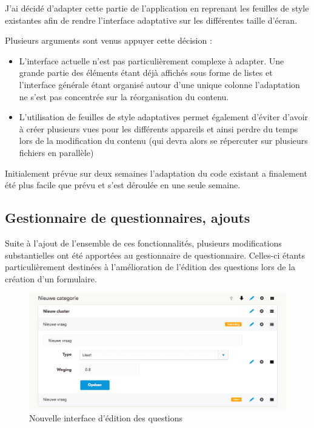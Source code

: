 \documentclass[12pt,a4paper]{book}
\begin{document}
J'ai décidé d'adapter cette partie de l'application en reprenant les feuilles de style existantes afin de rendre l'interface adaptative sur les différentes taille d'écran.

Plusieurs arguments sont venus appuyer cette décision :
\begin{itemize}
  \item L'interface actuelle n'est pas particulièrement complexe à adapter. Une grande partie des éléments étant déjà affichés sous forme de listes et l'interface générale étant organisé autour d'une unique colonne l'adaptation ne s'est pas concentrée sur la réorganisation du contenu.
  \item L'utilisation de feuilles de style adaptatives permet également d'éviter d'avoir à créer plusieurs vues pour les différents appareils et ainsi perdre du temps lors de la modification du contenu (qui devra alors se répercuter sur plusieurs fichiers en parallèle)
\end{itemize}

Initialement prévue sur deux semaines l'adaptation du code existant a finalement été plus facile que prévu et s'est déroulée en une seule semaine.

\subsection{Gestionnaire de questionnaires, ajouts}

Suite à l'ajout de l'ensemble de ces fonctionnalités, plusieurs modifications substantielles ont été apportées au gestionnaire de questionnaire. Celles-ci étants particulièrement destinées à l'amélioration de l'édition des questions lors de la création d'un formulaire.

\begin{figure}[htp]
\centering
\includegraphics[scale=.45]{img/editor.png}
 \caption{Nouvelle interface d'édition des questions}
 \label{fig.editor}
\end{figure}
\end{document}
